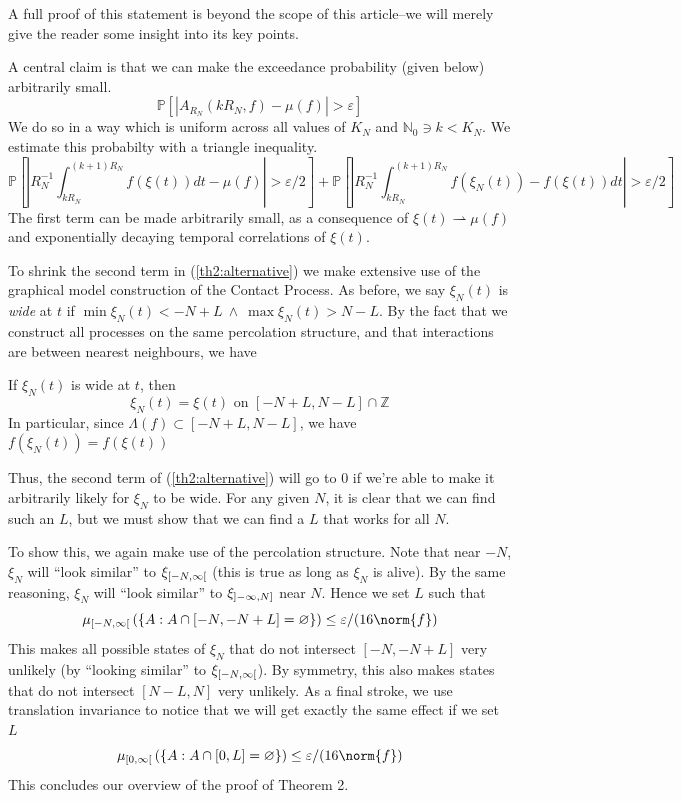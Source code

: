 \documentclass{scrartcl}
\newcommand{\loi}[2]{\interval[open left]{#1}{#2}}
\newcommand{\roi}[2]{\interval[open right]{#1}{#2}}
\newcommand{\Ninf}{\roi{-N}{\infty}}
\newcommand{\infN}{\loi{-\infty}{N}}
\begin{document}
A full proof of this statement is beyond the scope of this article--we will merely give the reader some insight into its key points.

A central claim is that we can make the exceedance probability (given below) arbitrarily small.
\[
    \mathbb{P}\left[ |A_{R_N}(kR_N, f) - \mu(f)| > \varepsilon\right]
\]
We do so in a way which is uniform across all values of $K_N$ and $\mathbb{N}_0 \ni k < K_N$. We estimate this probabilty with a triangle inequality.
\footnotesize
\begin{equation}
    \mathbb{P}\left[ \left|R_N^{-1}\int_{kR_N}^{(k+1)R_N}f(\xi(t))dt - \mu(f)\right| > \varepsilon/2 \right] + 
    \mathbb{P}\left[ \left|R_N^{-1}\int_{kR_N}^{(k+1)R_N}f(\xi_N(t)) - f(\xi(t))dt \right| > \varepsilon/2\right]
    \label{th2:alternative}
\end{equation}
\normalsize
The first term can be made arbitrarily small, as a consequence of $\xi(t) \rightharpoonup \mu(f)$ and exponentially decaying temporal correlations of $\xi(t)$.

To shrink the second term in (\ref{th2:alternative}) we make extensive use of the graphical model construction of the Contact Process. As before, we say $\xi_N(t)$ is \emph{wide} at $t$ if $\min \xi_N(t) < -N + L\ \land\ \max\xi_N(t) > N - L$.
By the fact that we construct all processes on the same percolation structure, and that interactions are between nearest neighbours, we have
\begin{lemma}
    If $\xi_N(t)$ is wide at $t$, then \[\xi_N(t) = \xi(t)\text{ on }[-N + L, N - L] \cap \mathbb{Z}\]
    In particular, since $\Lambda(f) \subset [-N+L, N-L]$, we have $f(\xi_N(t)) = f(\xi(t))$
\end{lemma}
Thus, the second term of (\ref{th2:alternative}) will go to 0 if we're able to make it arbitrarily likely for $\xi_N$ to be wide. For any given $N$, it is clear that we can find such an $L$, but we must show that we can find a $L$ that works for all $N$.

To show this, we again make use of the percolation structure. Note that near $-N$, $\xi_N$ will ``look similar'' to $\xi_{\Ninf}$ (this is true as long as $\xi_N$ is alive). By the same reasoning, $\xi_N$ will ``look similar'' to $\xi_{\infN}$ near $N$.
Hence we set $L$ such that
    \[
        \mu_{\Ninf}\left( \left\{ A : A \cap [-N,-N+L] = \varnothing \right\} \right)  \leq \varepsilon/(16\norm{f})
    \]
This makes all possible states of $\xi_N$ that do not intersect $[-N, -N+L]$ very unlikely (by ``looking similar'' to $\xi_{\Ninf}$). By symmetry, this also makes states
that do not intersect $[N-L, N]$ very unlikely. As a final stroke, we use translation invariance to notice that we will get exactly the same effect if we set $L$ 
    \[
        \mu_{\roi{0}{\infty}}\left( \left\{ A : A \cap [0,L] = \varnothing \right\} \right) \leq \varepsilon/(16\norm{f})
    \]
This concludes our overview of the proof of Theorem 2.

\printbibliography
        
\end{document}

